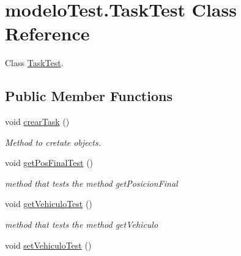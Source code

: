 \hypertarget{classmodelo_test_1_1_task_test}{}\section{modelo\+Test.\+Task\+Test Class Reference}
\label{classmodelo_test_1_1_task_test}


Class \mbox{\hyperlink{classmodelo_test_1_1_task_test}{Task\+Test}}.  


\subsection*{Public Member Functions}
\begin{DoxyCompactItemize}
\item 
\mbox{\label{classmodelo_test_1_1_task_test_a3c94bd5473173fc7bfcdf8019b0eae07}} 
void \mbox{\hyperlink{classmodelo_test_1_1_task_test_a3c94bd5473173fc7bfcdf8019b0eae07}{crear\+Task}} ()
\begin{DoxyCompactList}\small\item\em Method to cretate objects. \end{DoxyCompactList}\item 
\mbox{\label{classmodelo_test_1_1_task_test_a8af6b2ec3314c104d23c6cbad5eaee11}} 
void \mbox{\hyperlink{classmodelo_test_1_1_task_test_a8af6b2ec3314c104d23c6cbad5eaee11}{get\+Pos\+Final\+Test}} ()
\begin{DoxyCompactList}\small\item\em method that tests the method get\+Posicion\+Final \end{DoxyCompactList}\item 
\mbox{\label{classmodelo_test_1_1_task_test_afef59d8849fd5b9b205c673d732cf6d2}} 
void \mbox{\hyperlink{classmodelo_test_1_1_task_test_afef59d8849fd5b9b205c673d732cf6d2}{get\+Vehiculo\+Test}} ()
\begin{DoxyCompactList}\small\item\em method that tests the method get\+Vehiculo \end{DoxyCompactList}\item 
\mbox{\label{classmodelo_test_1_1_task_test_a3716dfd7d3e84093e271e2aeaf7f7d7e}} 
void \mbox{\hyperlink{classmodelo_test_1_1_task_test_a3716dfd7d3e84093e271e2aeaf7f7d7e}{set\+Vehiculo\+Test}} ()

\end{DoxyCompactItemize}
